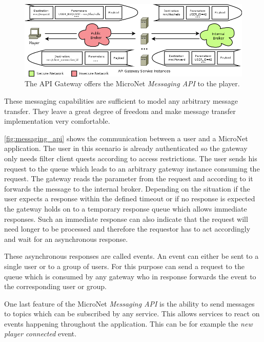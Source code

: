 \begin{figure}
	\centering
	\hspace*{-1.5cm}
	\includegraphics[width=1.2\textwidth]{images/architecture/MessagingAPI}
	\caption{The API Gateway offers the MicroNet \textit{Messaging API} to the player.}
	\label{fig:messaging_api}
\end{figure}

These messaging capabilities are sufficient to model any arbitrary message
transfer. They leave a great degree of freedom and make message transfer
implementation very comfortable. 

\autoref{fig:messaging_api} shows the communication between a user and a
MicroNet application. The user in this scenario is already authenticated so the
gateway only needs filter client quests according to access restrictions. The
user sends his request to the  queue which leads to an
arbitrary gateway instance consuming the request. The gateway reads the
 parameter from the request and according to it forwards the
message to the internal broker. Depending on the situation if the user expects a
response within the defined timeout or if no response is expected the
gateway holds on to a temporary response queue which allows immediate responses.
Such an immediate response can also indicate that the request will need longer
to be processed and therefore the requestor has to act accordingly and wait for
an asynchronous response.

These asynchronous responses are called events. An event can either be sent to a
single user or to a group of users. For this purpose \mss{} can send a request
to the  queue which is consumed by any gateway who in
response forwards the event to the corresponding user or group.

One last feature of the MicroNet \textit{Messaging API} is the ability to send messages
to topics which can be subscribed by any service. This allows services to react
on events happening throughout the application. This can be for example the
\textit{new player connected} event.











